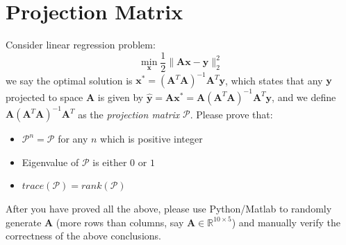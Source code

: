 \documentclass[11pt]{article}
\newcommand{\R}{\mathbb{R}}
\newcommand{\mtx}[1]{\mathbf{#1}}
\newcommand{\vct}[1]{\mathbf{#1}}
\def \mA {\mtx{A}}
\def \mU {\mtx{U}}
\def \mS {\mtx{S}}
\def \mX {\mtx{X}}
\def \vu {\vct{u}}
\def \vx {\vct{x}}
\def \vy {\vct{y}}
\def \R {\mathbb{R}}
\begin{document}
\section*{Projection Matrix}
Consider linear regression problem:
\begin{equation}
	\min\limits_{\vx}\frac{1}{2}\|\mA\vx-\vy\|^2_2
\end{equation}
we say the optimal solution is $\vx^*=(\mA^T\mA)^{-1}\mA^T\vy$, which states that any $\vy$ projected to space $\mA$ is given by $\hat{\vy}=\mA\vx^*=\mA(\mA^T\mA)^{-1}\mA^T\vy$, and we define $\mA(\mA^T\mA)^{-1}\mA^T$ as the \textit{projection matrix} $\mathcal{P}$. Please prove that:
\begin{itemize}
	\item $\mathcal{P}^n=\mathcal{P}$ for any $n$ which is positive integer
	\item Eigenvalue of $\mathcal{P}$ is either $0$ or $1$
	\item $trace(\mathcal{P})=rank(\mathcal{P})$
\end{itemize}
After you have proved all the above, please use Python/Matlab to randomly generate $\mA$ (more rows than columns, say $\mA\in\R^{10\times5}$) and manually verify the correctness of the above conclusions.
\end{document}
